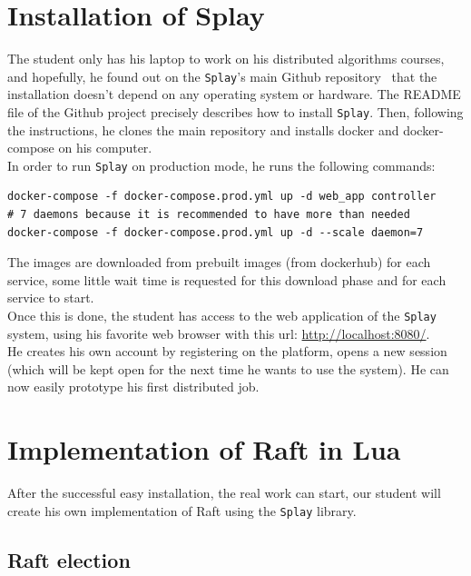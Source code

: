 \documentclass{eplmastersthesis}
\begin{document}
    \section{Installation of Splay}

      The student only has his laptop to work on his distributed algorithms
      courses, and hopefully, he found out on the \texttt{Splay}'s main Github
      repository~\cite{SplayV2Git} that the installation doesn't depend on
      any operating system or hardware. The README file of the Github project
      precisely describes how to install \texttt{Splay}. Then, following the
      instructions, he clones the main repository and installs docker and
      docker-compose on his computer.\\
      In order to run \texttt{Splay} on production mode, he runs the following
      commands: \\

      \begin{lstlisting}[style=MyBash]
docker-compose -f docker-compose.prod.yml up -d web_app controller
# 7 daemons because it is recommended to have more than needed
docker-compose -f docker-compose.prod.yml up -d --scale daemon=7
      \end{lstlisting}

      The images are downloaded from prebuilt images (from dockerhub) for
      each service, some little wait time is requested for this download
      phase and for each service to start.\\
      Once this is done, the student has access to the web application of
      the \texttt{Splay} system, using his favorite web browser with this url:
      \url{http://localhost:8080/}.\\
      He creates his own account by registering on the platform, opens a new
      session (which will be kept open for the next time he wants to use
      the system). He can now easily prototype his first distributed job.

    \section{Implementation of Raft in Lua}

      After the successful easy installation, the real work can start, our
      student will create his own implementation of Raft using the \texttt{Splay}
      library.

      \subsection{Raft election}
\end{document}
